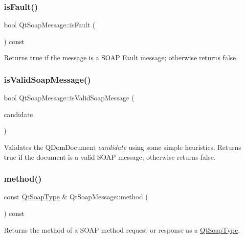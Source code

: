 \subsubsection{\texorpdfstring{is\+Fault()}{isFault()}}
{\footnotesize\ttfamily bool Qt\+Soap\+Message\+::is\+Fault (\begin{DoxyParamCaption}{ }\end{DoxyParamCaption}) const}

Returns true if the message is a S\+O\+AP Fault message; otherwise returns false. \mbox{\label{class_qt_soap_message_a2aa1fdeea09e733ac5fe103ece393b8a}} 
\subsubsection{\texorpdfstring{is\+Valid\+Soap\+Message()}{isValidSoapMessage()}}
{\footnotesize\ttfamily bool Qt\+Soap\+Message\+::is\+Valid\+Soap\+Message (\begin{DoxyParamCaption}\item[{const Q\+Dom\+Document \&}]{candidate }\end{DoxyParamCaption})\hspace{0.3cm}{\ttfamily [protected]}}

Validates the Q\+Dom\+Document {\itshape candidate} using some simple heuristics. Returns true if the document is a valid S\+O\+AP message; otherwise returns false. \mbox{\label{class_qt_soap_message_a83b058700a430911c883a4cda80299c2}} 
\subsubsection{\texorpdfstring{method()}{method()}}
{\footnotesize\ttfamily const \mbox{\hyperlink{class_qt_soap_type}{Qt\+Soap\+Type}} \& Qt\+Soap\+Message\+::method (\begin{DoxyParamCaption}{ }\end{DoxyParamCaption}) const}

Returns the method of a S\+O\+AP method request or response as a \mbox{\hyperlink{class_qt_soap_type}{Qt\+Soap\+Type}}. \mbox{\label{class_qt_soap_message_acfd530c3e58c9443ddf74b36c922754c}} 

